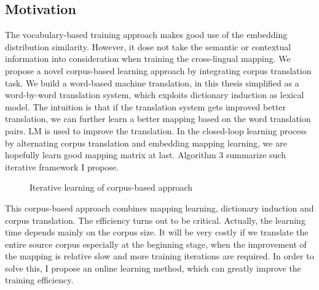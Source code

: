 \subsection{Motivation}
The vocabulary-based training approach makes good use of the  embedding distribution similarity. However, it dose not take the semantic or contextual information into consideration when training the cross-lingual mapping. We propose a novel corpus-based learning approach by integrating corpus translation task. We build a word-based machine translation, in this thesis simplified as a word-by-word translation system, which exploits dictionary induction as lexical model. The intuition is that if the translation system gets improved better translation, we can further learn a better mapping based on the word translation pairs. LM is used to improve the translation. In the closed-loop learning process by alternating corpus translation and embedding mapping learning, we are hopefully learn good mapping matrix at last. Algorithm 3 summarize such iterative framework I propose.\\
\begin{figure}[H]
	\centering
	\begin{minipage}{.7\linewidth}
		\begin{algorithm}[H]
			\SetAlgoLined
			\caption{Iterative learning of corpus-based approach}
		\end{algorithm}
	\end{minipage}
\end{figure}


This corpus-based approach combines mapping learning, dictionary induction and corpus translation. The efficiency turns out to be critical. Actually, the learning time depends mainly on the corpus size. It will be very costly if we translate the entire source corpus especially at the beginning stage, when the improvement of the mapping is relative slow and more training iterations are required. In order to solve this, I propose an online learning method, which can greatly improve the training efficiency. 

